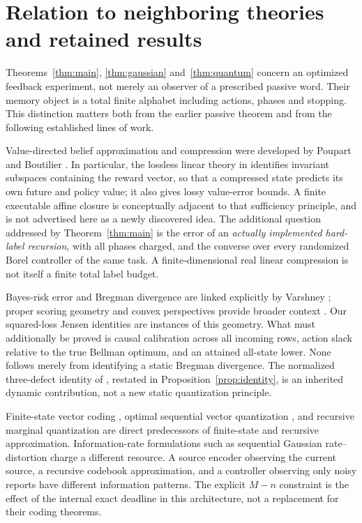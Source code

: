 \section{Relation to neighboring theories and retained results}\label{sec:comparison}
Theorems~\ref{thm:main}, \ref{thm:gaussian} and~\ref{thm:quantum} concern an optimized feedback experiment, not merely an observer of a prescribed passive word. Their memory object is a total finite alphabet including actions, phases and stopping. This distinction matters both from the earlier passive theorem and from the following established lines of work.

Value-directed belief approximation and compression were developed by Poupart and Boutilier \cite{PB2000,PB2001,PB2002}. In particular, the lossless linear theory in \cite{PB2002} identifies invariant subspaces containing the reward vector, so that a compressed state predicts its own future and policy value; it also gives lossy value-error bounds. A finite executable affine closure is conceptually adjacent to that sufficiency principle, and is not advertised here as a newly discovered idea. The additional question addressed by Theorem~\ref{thm:main} is the error of an \emph{actually implemented hard-label recursion}, with all phases charged, and the converse over every randomized Borel controller of the same task. A finite-dimensional real linear compression is not itself a finite total label budget.

Bayes-risk error and Bregman divergence are linked explicitly by Varshney \cite{Varshney2011}; proper scoring geometry and convex perspectives provide broader context \cite{Gneiting2007,Boyd2004}. Our squared-loss Jensen identities are instances of this geometry. What must additionally be proved is causal calibration across all incoming rows, action slack relative to the true Bellman optimum, and an attained all-state lower. None follows merely from identifying a static Bregman divergence. The normalized three-defect identity of \cite{GTFBayes}, restated in Proposition~\ref{prop:identity}, is an inherited dynamic contribution, not a new static quantization principle.

Finite-state vector coding \cite{Foster1985}, optimal sequential vector quantization \cite{BMT2001}, and recursive marginal quantization \cite{Pages2015} are direct predecessors of finite-state and recursive approximation. Information-rate formulations such as sequential Gaussian rate--distortion \cite{Tanaka2017} charge a different resource. A source encoder observing the current source, a recursive codebook approximation, and a controller observing only noisy reports have different information patterns. The explicit $M-n$ constraint is the effect of the internal exact deadline in this architecture, not a replacement for their coding theorems.

